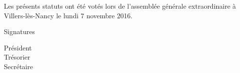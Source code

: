 \documentclass{article}
\begin{document}
	\vspace*{5cm}
	\begin{center}
		{\large\light Les présents statuts ont été votés lors de l’assemblée
		générale extraordinaire à Villers-lès-Nancy le lundi 7 novembre 2016.}
	\end{center}
    \vspace{3cm}
	Signatures\par
	\begin{multicols}{3}
	    \begin{center}
	        Président \\
	        Trésorier \\
	        Secrétaire
	    \end{center}
	\end{multicols}
    
\end{document}
